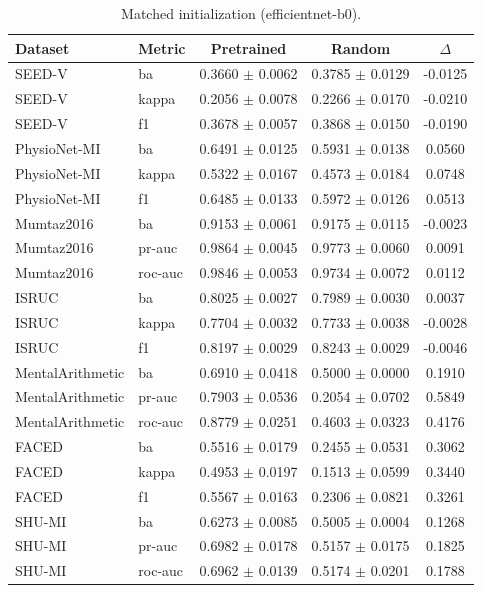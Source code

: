 \begin{table}[tbp]\centering\scriptsize\caption{Matched initialization (efficientnet-b0).}\begin{tabular}{@{}l l c c c@{}}\toprule Dataset & Metric & Pretrained & Random & $\Delta$ \\ \midrule
SEED-V & ba & 0.3660 $\pm$ 0.0062 & 0.3785 $\pm$ 0.0129 & -0.0125 \\
SEED-V & kappa & 0.2056 $\pm$ 0.0078 & 0.2266 $\pm$ 0.0170 & -0.0210 \\
SEED-V & f1 & 0.3678 $\pm$ 0.0057 & 0.3868 $\pm$ 0.0150 & -0.0190 \\
PhysioNet-MI & ba & 0.6491 $\pm$ 0.0125 & 0.5931 $\pm$ 0.0138 & 0.0560 \\
PhysioNet-MI & kappa & 0.5322 $\pm$ 0.0167 & 0.4573 $\pm$ 0.0184 & 0.0748 \\
PhysioNet-MI & f1 & 0.6485 $\pm$ 0.0133 & 0.5972 $\pm$ 0.0126 & 0.0513 \\
Mumtaz2016 & ba & 0.9153 $\pm$ 0.0061 & 0.9175 $\pm$ 0.0115 & -0.0023 \\
Mumtaz2016 & pr-auc & 0.9864 $\pm$ 0.0045 & 0.9773 $\pm$ 0.0060 & 0.0091 \\
Mumtaz2016 & roc-auc & 0.9846 $\pm$ 0.0053 & 0.9734 $\pm$ 0.0072 & 0.0112 \\
ISRUC & ba & 0.8025 $\pm$ 0.0027 & 0.7989 $\pm$ 0.0030 & 0.0037 \\
ISRUC & kappa & 0.7704 $\pm$ 0.0032 & 0.7733 $\pm$ 0.0038 & -0.0028 \\
ISRUC & f1 & 0.8197 $\pm$ 0.0029 & 0.8243 $\pm$ 0.0029 & -0.0046 \\
MentalArithmetic & ba & 0.6910 $\pm$ 0.0418 & 0.5000 $\pm$ 0.0000 & 0.1910 \\
MentalArithmetic & pr-auc & 0.7903 $\pm$ 0.0536 & 0.2054 $\pm$ 0.0702 & 0.5849 \\
MentalArithmetic & roc-auc & 0.8779 $\pm$ 0.0251 & 0.4603 $\pm$ 0.0323 & 0.4176 \\
FACED & ba & 0.5516 $\pm$ 0.0179 & 0.2455 $\pm$ 0.0531 & 0.3062 \\
FACED & kappa & 0.4953 $\pm$ 0.0197 & 0.1513 $\pm$ 0.0599 & 0.3440 \\
FACED & f1 & 0.5567 $\pm$ 0.0163 & 0.2306 $\pm$ 0.0821 & 0.3261 \\
SHU-MI & ba & 0.6273 $\pm$ 0.0085 & 0.5005 $\pm$ 0.0004 & 0.1268 \\
SHU-MI & pr-auc & 0.6982 $\pm$ 0.0178 & 0.5157 $\pm$ 0.0175 & 0.1825 \\
SHU-MI & roc-auc & 0.6962 $\pm$ 0.0139 & 0.5174 $\pm$ 0.0201 & 0.1788 \\

\end{tabular}
\end{table}
